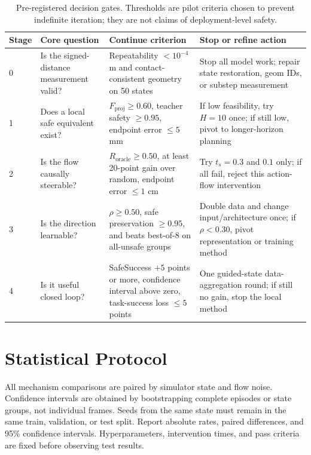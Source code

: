 \documentclass[10pt,conference]{IEEEtran}
\newcommand{\1}{\mathbf{1}}
\begin{document}
\begin{table}[t]
\centering
\caption{Pre-registered decision gates. Thresholds are pilot criteria chosen to prevent indefinite iteration; they are not claims of deployment-level safety.}
\label{tab:gates}
\setlength{\tabcolsep}{5pt}
\begin{tabular}{p{1.35cm}p{3.6cm}p{4.8cm}p{5.0cm}}
\toprule
Stage & Core question & Continue criterion & Stop or refine action \\
\midrule
0 & Is the signed-distance measurement valid? & Repeatability $<10^{-4}$ m and contact-consistent geometry on 50 states & Stop all model work; repair state restoration, geom IDs, or substep measurement \\
1 & Does a local safe equivalent exist? & $F_{\mathrm{proj}}\geq0.60$, teacher safety $\geq0.95$, endpoint error $\leq5$ mm & If low feasibility, try $H=10$ once; if still low, pivot to longer-horizon planning \\
2 & Is the flow causally steerable? & $R_{\mathrm{oracle}}\geq0.50$, at least 20-point gain over random, endpoint error $\leq1$ cm & Try $t_s=0.3$ and $0.1$ only; if all fail, reject this action-flow intervention \\
3 & Is the direction learnable? & $\rho\geq0.50$, safe preservation $\geq0.95$, and beats best-of-$8$ on all-unsafe groups & Double data and change input/architecture once; if $\rho<0.30$, pivot representation or training method \\
4 & Is it useful closed loop? & SafeSuccess $+5$ points or more, confidence interval above zero, task-success loss $\leq5$ points & One guided-state data-aggregation round; if still no gain, stop the local method \\
\bottomrule
\end{tabular}
\end{table}

\section{Statistical Protocol}

All mechanism comparisons are paired by simulator state and flow noise. Confidence intervals are obtained by bootstrapping complete episodes or state groups, not individual frames. Seeds from the same state must remain in the same train, validation, or test split. Report absolute rates, paired differences, and 95\% confidence intervals. Hyperparameters, intervention times, and pass criteria are fixed before observing test results.
\end{document}

